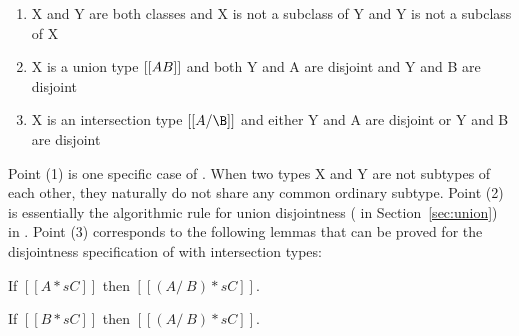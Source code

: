 \begin{enumerate}
  \item{X and Y are both classes and X is not a subclass of Y and Y is not a subclass of X}
  \item{X is a union type $[[A \/ B]]$ and both Y and A are disjoint and Y and B are disjoint}
  \item{X is an intersection type $[[A/\B]]$ and either Y and A are disjoint or Y and B are disjoint}
\end{enumerate}

\noindent
Point (1) is one specific case of .
When two types X and Y are not subtypes of each other, they naturally do not share any common ordinary subtype.
Point (2) is essentially the algorithmic
rule for union disjointness ( in Section~\ref{sec:union}) in \cal.
Point (3) corresponds to the following lemmas that can be proved
for the disjointness specification of \name with intersection types:

\begin{comment}
When a component type (either $[[A]]$ or $[[B]]$) of an intersection type $[[A /\ B]]$
is disjoint to some type $[[C]]$. Then that specific
component type (either $[[A]]$ or $[[B]]$) and type $[[C]]$
do not share any common ordinary subtype.
If a component type of intersection type do not share ordinary subtype
with some type, then naturally complete intersection type do not share
ordinary subtype with that type.
Therefore, $[[C]]$ is disjoint to $[[A /\ B]]$ if it is disjoint to either of
the component type in intersection type.
For example, type $[[Int /\ Top]]$ is disjoint to type $[[Bool]]$.
Because first component of $[[Int /\ Top]]$, which is $[[Int]]$ in this case,
is disjoint to $[[Bool]]$.
Following \Cref{def:inter:disj}, $[[Int]]$ and $[[Bool]]$ do not share any
ordinary subtype and so $[[Int /\ Top]]$ and $[[Bool]]$.
We show this property with following two lemmas in \name:
\end{comment}

\begin{lemma}
  If $[[A *s C]]$ then $[[(A /\ B) *s C]]$.
\label{lemma:discussion:comp:left:inter}
\end{lemma}
\vspace{-15pt}
\begin{lemma}
  If $[[B *s C]]$ then $[[(A /\ B) *s C]]$.
\label{lemma:discussion:comp:right:inter}
\end{lemma}
